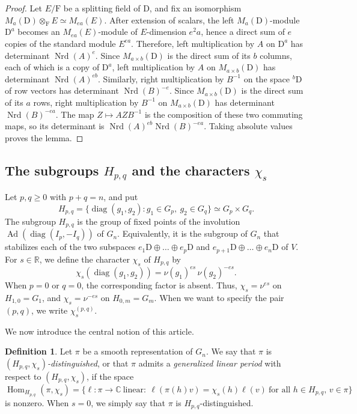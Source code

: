 \documentclass[11pt]{amsart}
\numberwithin{equation}{section}
\theoremstyle{plain}
\theoremstyle{definition}
\newtheorem{definition}[theorem]{Definition}
\theoremstyle{remark}
\newcommand{\R}{\mathbb{R}}
\newcommand{\C}{\mathbb{C}}
\DeclareMathOperator{\Hom}{Hom}
\DeclareMathOperator{\Nrd}{Nrd}
\DeclareMathOperator{\diag}{diag}
\DeclareMathOperator{\Ad}{Ad}
\begin{document}
\begin{proof}
	Let $E/\mathrm{F}$ be a splitting field of $\mathrm{D}$, and fix an isomorphism $M_a(\mathrm{D})\otimes_{\mathrm{F}}E\simeq M_{ea}(E)$. After extension of scalars, the left $M_a(\mathrm{D})$-module $\mathrm{D}^a$ becomes an $M_{ea}(E)$-module of $E$-dimension $e^2a$, hence a direct sum of $e$ copies of the standard module $E^{ea}$. Therefore, left multiplication by $A$ on $\mathrm{D}^a$ has determinant $\Nrd(A)^e$. Since $M_{a\times b}(\mathrm{D})$ is the direct sum of its $b$ columns, each of which is a copy of $\mathrm{D}^a$, left multiplication by $A$ on $M_{a\times b}(\mathrm{D})$ has determinant $\Nrd(A)^{eb}$. Similarly, right multiplication by $B^{-1}$ on the space ${}^b\mathrm{D}$ of row vectors has determinant $\Nrd(B)^{-e}$. Since $M_{a\times b}(\mathrm{D})$ is the direct sum of its $a$ rows, right multiplication by $B^{-1}$ on $M_{a\times b}(\mathrm{D})$ has determinant $\Nrd(B)^{-ea}$. The map $Z\mapsto AZB^{-1}$ is the composition of these two commuting maps, so its determinant is $\Nrd(A)^{eb}\Nrd(B)^{-ea}$. Taking absolute values proves the lemma.
\end{proof}

\subsection{The subgroups \texorpdfstring{$H_{p,q}$}{Hpq} and the characters \texorpdfstring{$\chi_s$}{chi s}}\label{ss:Hpq}

Let $p,q\ge0$ with $p+q=n$, and put
$$
H_{p,q}=\{\diag(g_1,g_2):g_1\in G_p,\ g_2\in G_q\}\simeq G_p\times G_q .
$$
The subgroup $H_{p,q}$ is the group of fixed points of the involution $\Ad(\diag(I_p,-I_q))$ of $G_n$. Equivalently, it is the subgroup of $G_n$ that stabilizes each of the two subspaces $e_1\mathrm{D}\oplus\dots\oplus e_p\mathrm{D}$ and $e_{p+1}\mathrm{D}\oplus\dots\oplus e_n\mathrm{D}$ of $V$. For $s\in\R$, we define the character $\chi_s$ of $H_{p,q}$ by
$$
\chi_s(\diag(g_1,g_2))=\nu(g_1)^{es}\,\nu(g_2)^{-es}.
$$
When $p=0$ or $q=0$, the corresponding factor is absent. Thus, $\chi_s=\nu^{es}$ on $H_{1,0}=G_1$, and $\chi_s=\nu^{-es}$ on $H_{0,m}=G_m$. When we want to specify the pair $(p,q)$, we write $\chi_s^{(p,q)}$.

We now introduce the central notion of this article.

\begin{definition}
	Let $\pi$ be a smooth representation of $G_n$. We say that $\pi$ is \emph{$(H_{p,q},\chi_s)$-distinguished}, or that $\pi$ admits a \emph{generalized linear period} with respect to $(H_{p,q},\chi_s)$, if the space
	$$
	\Hom_{H_{p,q}}(\pi,\chi_s)=\{\ell\colon\pi\to\C\ \text{linear}:\ \ell(\pi(h)v)=\chi_s(h)\ell(v)\ \text{for all } h\in H_{p,q},\,v\in\pi\}
	$$
	is nonzero. When $s=0$, we simply say that $\pi$ is $H_{p,q}$-distinguished.
\end{definition}
\end{document}
